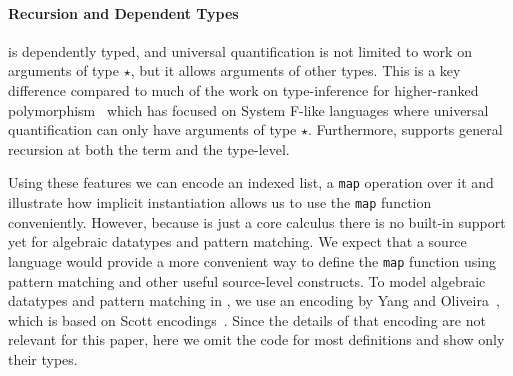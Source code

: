 \paragraph{Recursion and Dependent Types}

\name is dependently typed, and universal quantification is not limited to work
on arguments of type $\star$, but it allows arguments of other types. This is
a key difference compared to much of the work on type-inference for higher-ranked
polymorphism~\cite{dunfield2013complete,le2003ml,leijen2008hmf,vytiniotis2008fph,jones2007practical}
which has focused on System F-like
languages where universal quantification can only have arguments of type $\star$.
Furthermore, \name supports general recursion at both the term and the type-level.

Using these features we can encode an indexed list, a \verb|map| operation over it
and illustrate how implicit instantiation allows us to use the \verb|map| function
conveniently.
However, because \name is just a core calculus there is no built-in support
yet for algebraic datatypes and pattern matching.
We expect that a source language would provide a more convenient
way to define the \verb|map| function using pattern matching and other useful source-level
constructs. To model algebraic datatypes and pattern matching in \name, we
use an encoding by Yang and Oliveira~\cite{yang2019pure},
which is based on Scott encodings~\cite{mogensen1992efficient}.
Since the details of that encoding are not relevant for this paper,
here we omit the code for most definitions and show only their types.


